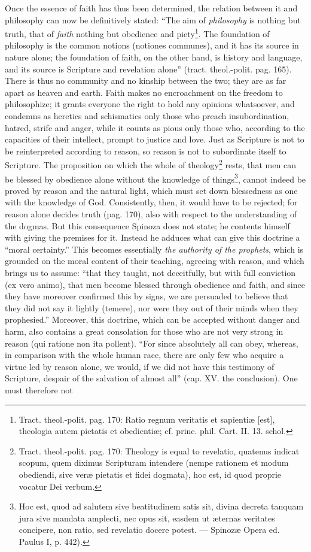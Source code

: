 \documentclass[12pt,a4paper,openany]{book}
\newcommand{\opage}[1]{\marginnote{\footnotesize\textit{[#1]}}}
\begin{document}
Once the essence of faith has thus been determined, the relation between it and philosophy can now be definitively stated: ``The aim of \emph{philosophy} is nothing but truth, that of \emph{faith} nothing but obedience and piety\footnote{Tract. theol.-polit. pag. 170: Ratio regnum veritatis et sapientiæ [est], theologia autem pietatis et obedientiæ; cf. princ. phil. Cart. II. 13. schol.}. The foundation of philosophy is the common notions (notiones communes), and it has its source in nature alone; the foundation of faith, on the other hand, is history and language, and its source is Scripture and revelation alone'' (tract. theol.-polit. pag. 165). There is thus no community and no kinship between the two; they are as far apart as heaven and earth. Faith makes no encroachment on the freedom to philosophize; it grants everyone the right to hold any opinions whatsoever, and condemns as heretics and schismatics only those who preach insubordination, hatred, strife and anger, while it counts as pious only those
\opage{158}\setcounter{footnote}{0}who, according to the capacities of their intellect, prompt to justice and love. Just as Scripture is not to be reinterpreted according to reason, so reason is not to subordinate itself to Scripture. The proposition on which the whole of theology\footnote{Tract. theol.-polit. pag. 170: Theology is equal to revelatio, quatenus indicat scopum, quem diximus Scripturam intendere (nempe rationem et modum obediendi, sive veræ pietatis et fidei dogmata), hoc est, id quod proprie vocatur Dei verbum.} rests, that men can be blessed by obedience alone without the knowledge of things\footnote{Hoc est, quod ad salutem sive beatitudinem satis sit, divina decreta tanquam jura sive mandata amplecti, nec opus sit, easdem ut æternas veritates concipere, non ratio, sed revelatio docere potest. --- Spinozæ Opera ed. Paulus I, p. 442).}, cannot indeed be proved by reason and the natural light, which must set down blessedness as one with the knowledge of God. Consistently, then, it would have to be rejected; for reason alone decides truth (pag. 170), also with respect to the understanding of the dogmas. But this consequence Spinoza does not state; he contents himself with giving the premises for it. Instead he adduces what can give this doctrine a ``moral certainty.'' This becomes essentially \emph{the authority of the prophets}, which is grounded on the moral content of their teaching, agreeing with reason, and which brings us to assume: ``that they taught, not deceitfully, but with full conviction (ex vero animo), that men become blessed through obedience and faith, and since they have moreover confirmed this by signs, we are persuaded to believe that they did not say it lightly (temere), nor were they out of their minds when they prophesied.'' Moreover, this doctrine, which can be accepted without danger and harm, also contains a great consolation for those who are not very strong in reason (qui ratione non ita pollent). ``For since absolutely all can obey, whereas, in comparison with the whole human race, there are only few who acquire a virtue led by reason alone, we would, if we did not have this testimony of Scripture, despair of the salvation of almost all'' (cap. XV. the conclusion). One must therefore not %
\end{document}

